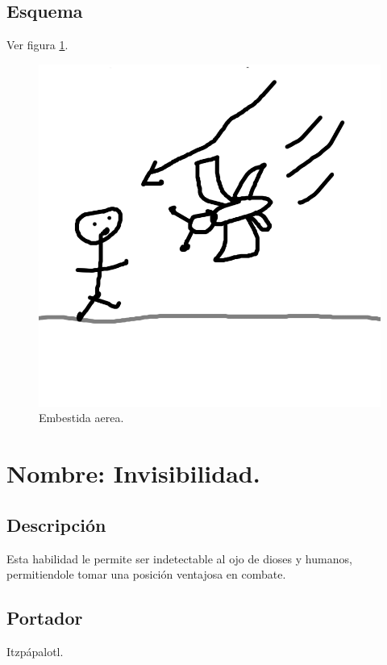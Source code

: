 \subsection{Esquema}
			Ver figura \ref{fig:embestidaA}.
			\begin{figure}
				\centering
				\includegraphics[height=0.2 \textheight]{Imagenes/embestidaA}
				\caption{Embestida aerea.}
				\label{fig:embestidaA}
			\end{figure}
\section{Nombre: Invisibilidad.} \label{hab.Invis}
\subsection{Descripción}
Esta habilidad le permite ser indetectable al ojo de dioses y humanos, permitiendole tomar una posición ventajosa en combate.
\subsection{Portador}
Itzpápalotl.
